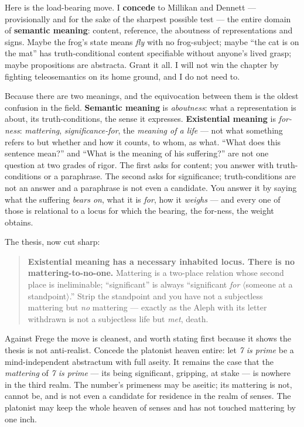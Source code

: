 \documentclass[11pt]{article}
\begin{document}
Here is the load-bearing move. I \textbf{concede} to Millikan and Dennett — provisionally and for the sake of the sharpest possible test — the entire domain of \textbf{semantic meaning}: content, reference, the aboutness of representations and signs. Maybe the frog's state means \emph{fly} with no frog-subject; maybe ``the cat is on the mat'' has truth-conditional content specifiable without anyone's lived grasp; maybe propositions are abstracta. Grant it all. I will not win the chapter by fighting teleosemantics on its home ground, and I do not need to.

Because there are two meanings, and the equivocation between them is the oldest confusion in the field. \textbf{Semantic meaning} is \emph{aboutness}: what a representation is about, its truth-conditions, the sense it expresses. \textbf{Existential meaning} is \emph{for-ness}: \emph{mattering}, \emph{significance-for}, the \emph{meaning of a life} — not what something refers to but whether and how it counts, to whom, as what. ``What does this sentence mean?'' and ``What is the meaning of his suffering?'' are not one question at two grades of rigor. The first asks for content; you answer with truth-conditions or a paraphrase. The second asks for significance; truth-conditions are not an answer and a paraphrase is not even a candidate. You answer it by saying what the suffering \emph{bears on}, what it is \emph{for}, how it \emph{weighs} — and every one of those is relational to a locus for which the bearing, the for-ness, the weight obtains.

The thesis, now cut sharp:

\begin{quote}
\textbf{Existential meaning has a necessary inhabited locus. There is no mattering-to-no-one.} Mattering is a two-place relation whose second place is ineliminable; ``significant'' is always ``significant \emph{for} \ensuremath{\langle}someone at a standpoint\ensuremath{\rangle}.'' Strip the standpoint and you have not a subjectless mattering but \emph{no} mattering — exactly as the Aleph with its letter withdrawn is not a subjectless life but \emph{met}, death.
\end{quote}

Against Frege the move is cleanest, and worth stating first because it shows the thesis is not anti-realist. Concede the platonist heaven entire: let \emph{7 is prime} be a mind-independent abstractum with full aseity. It remains the case that the \emph{mattering} of \emph{7 is prime} — its being significant, gripping, at stake — is nowhere in the third realm. The number's primeness may be aseitic; its mattering is not, cannot be, and is not even a candidate for residence in the realm of senses. The platonist may keep the whole heaven of senses and has not touched mattering by one inch.
\end{document}
